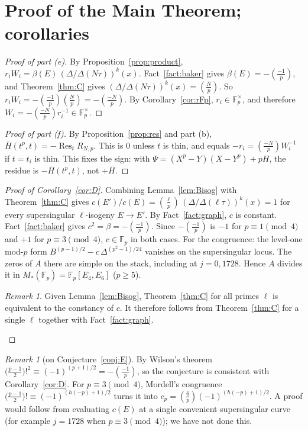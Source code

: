 \documentclass[11pt,a4paper]{article}
\numberwithin{equation}{section}
\theoremstyle{definition}
\theoremstyle{remark}
\newtheorem{remark}[theorem]{Remark}
\newcommand{\Fp}{\mathbb F_p}
\newcommand{\Res}{\operatorname{Res}}
\newcommand{\leg}[2]{\left(\frac{#1}{#2}\right)}
\newcommand{\Lp}[1]{\left(\frac{#1}{p}\right)}
\begin{document}
\section{Proof of the Main Theorem; corollaries}\label{sec:proof}

\begin{proof}[Proof of part (e)]
By Proposition~\ref{prop:product}, $r_iW_i=\beta(E)\,(\Delta/\Delta(N\tau))^k(x)$. Fact~\ref{fact:baker}
gives $\beta(E)=-\Lp{-1}$, and Theorem~\ref{thm:C} gives $(\Delta/\Delta(N\tau))^k(x)=\Lp N$. So
$r_iW_i=-\Lp{-1}\Lp N=-\Lp{-N}$. By Corollary~\ref{cor:rFp}, $r_i\in\Fp^\times$, and therefore
$W_i=-\Lp{-N}r_i^{-1}\in\Fp^\times$.
\end{proof}

\begin{proof}[Proof of part (f)]
By Proposition~\ref{prop:res} and part (b), $\overline H(t^p,t)=-\Res_tR_{N,p}$. This is $0$ unless $t$ is thin, and equals
$-r_i=\Lp{-N}W_i^{-1}$ if $t=t_i$ is thin. This fixes the sign: with
$\Psi=(X^p-Y)(X-Y^p)+pH$, the residue is $-\overline H(t^p,t)$, not $+\overline H$.
\end{proof}

\begin{proof}[Proof of Corollary~\ref{cor:D}]
Combining Lemma~\ref{lem:Bisog} with Theorem~\ref{thm:C} gives
$c(E')/c(E)=\Lp\ell\,(\Delta/\Delta(\ell\tau))^k(x)=1$ for every supersingular $\ell$-isogeny
$E\to E'$. By Fact~\ref{fact:graph}, $c$ is constant. Fact~\ref{fact:baker} gives $c^2=\beta=-\Lp{-1}$.
Since $-\Lp{-1}$ is $-1$ for $p\equiv1\pmod4$ and $+1$ for $p\equiv3\pmod4$, $c\in\Fp$ in both cases.
For the congruence: the level-one mod-$p$ form $B^{(p-1)/2}-c\,\Delta^{(p^2-1)/24}$ vanishes on the supersingular locus.
The zeros of $A$ there are simple on the stack, including at $j=0,1728$. Hence $A$ divides it in
$M_*(\Fp)=\Fp[E_4,E_6]$ ($p\ge5$).
\begin{remark}
Given Lemma~\ref{lem:Bisog}, Theorem~\ref{thm:C} for all primes $\ell$ is equivalent to the constancy of $c$. It therefore
follows from Theorem~\ref{thm:C} for a single $\ell$ together with Fact~\ref{fact:graph}.
\end{remark}
\end{proof}

\begin{remark}[on Conjecture~\ref{conj:E}]
By Wilson's theorem $\bigl(\frac{p-1}2\bigr)!^2\equiv(-1)^{(p+1)/2}=-\Lp{-1}$, so the conjecture is
consistent with Corollary~\ref{cor:D}. For $p\equiv3\pmod4$, Mordell's congruence
$\bigl(\frac{p-1}2\bigr)!\equiv(-1)^{(h(-p)+1)/2}$ \citep{Mordell61} turns it into
$c_p=\leg6p(-1)^{(h(-p)+1)/2}$. A proof would follow from evaluating $c(E)$ at a single convenient
supersingular curve (for example $j=1728$ when $p\equiv3\pmod4$); we have not done this.
\end{remark}
\end{document}
